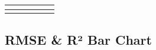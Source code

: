 \documentclass[
]{article}
\begin{document}
\begin{table}
\begin{tabular}[t]{l|c|c|>{}c|c|c}
\hline
\cellcolor[HTML]{cfe2ff}{10} & \cellcolor[HTML]{cfe2ff}{6. Local Regression (LOESS)} & \cellcolor[HTML]{cfe2ff}{GNPR} & \textbf{\cellcolor[HTML]{cfe2ff}{73005}} & \cellcolor[HTML]{cfe2ff}{52943} & \cellcolor[HTML]{cfe2ff}{0.6134}\\
\hline
\cellcolor[HTML]{cfe2ff}{11} & \cellcolor[HTML]{cfe2ff}{3. Step Function} & \cellcolor[HTML]{cfe2ff}{GNPR} & \textbf{\cellcolor[HTML]{cfe2ff}{83019}} & \cellcolor[HTML]{cfe2ff}{62574} & \cellcolor[HTML]{cfe2ff}{0.4998}\\
\hline
\end{tabular}
\end{table}

\subsection{RMSE \& R² Bar Chart}\label{rmse-ruxb2-bar-chart}
\end{document}
